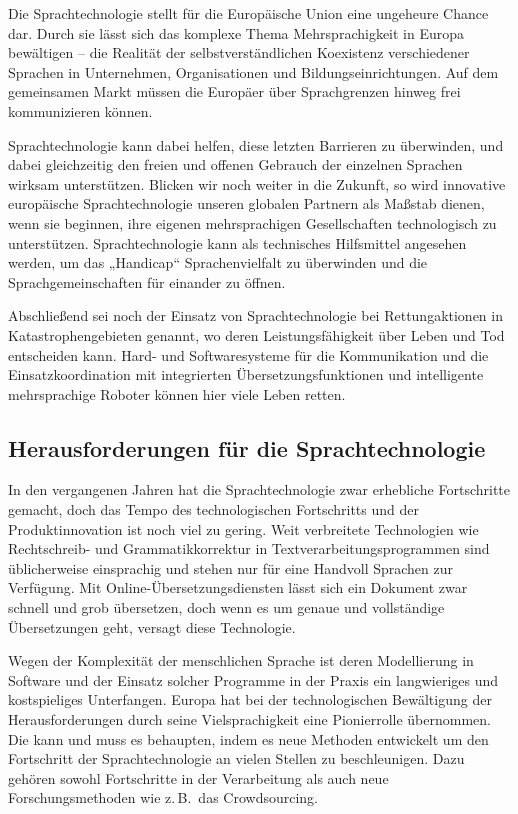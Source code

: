 \begin{multicols}{2}
Die Sprachtechnologie stellt für die Europäische Union eine ungeheure Chance dar. Durch sie lässt sich das komplexe Thema Mehrsprachigkeit in Europa bewältigen -- 
die Realität der selbstverständlichen Koexistenz verschiedener Sprachen in Unternehmen, Organisationen und Bildungseinrichtungen. 
Auf dem gemeinsamen Markt müssen die Europäer über Sprachgrenzen hinweg frei kommunizieren können.  


Sprachtechnologie kann dabei helfen, diese letzten Barrieren zu überwinden, und dabei gleichzeitig den freien und offenen Gebrauch 
der einzelnen Sprachen wirksam 
unterstützen. Blicken wir noch weiter in die Zukunft, so wird innovative europäische Sprachtechnologie unseren globalen Partnern als Maßstab dienen, wenn sie beginnen, ihre eigenen mehrsprachigen Gesellschaften technologisch zu unterstützen. Sprachtechnologie kann als technisches Hilfsmittel angesehen werden, um das „Handicap“ Sprachenvielfalt zu überwinden und die Sprachgemeinschaften für einander zu öffnen.

Abschließend sei noch der Einsatz von Sprachtechnologie bei Rettungaktionen in Katastrophengebieten genannt, wo deren Leistungsfähigkeit über Leben und Tod entscheiden kann. 
Hard- und Softwaresysteme für die Kommunikation und die Einsatzkoordination mit integrierten Übersetzungsfunktionen und  
intelligente mehrsprachige Roboter können hier viele Leben retten.

\subsection{Herausforderungen für die Sprachtechnologie}

In den vergangenen Jahren hat die Sprachtechnologie zwar erhebliche Fortschritte gemacht, doch das Tempo des technologischen Fortschritts und der Produktinnovation ist noch viel zu gering. Weit verbreitete Technologien wie Rechtschreib- und Grammatikkorrektur in Textverarbeitungsprogrammen sind üblicherweise einsprachig und stehen nur für eine Handvoll Sprachen zur Verfügung. Mit On\-line-Über\-set\-zungs\-diensten lässt sich ein Dokument zwar schnell und grob übersetzen, doch wenn es um genaue und vollständige Übersetzungen geht, versagt diese Technologie.


Wegen der Komplexität der menschlichen Sprache ist deren Modellierung in Software und der Einsatz solcher Programme in der Praxis ein langwieriges und kostspieliges Unterfangen. 
Europa hat bei der technologischen Bewältigung der Herausforderungen durch seine Vielsprachigkeit eine Pionierrolle übernommen.  Die kann und muss es behaupten, indem es neue Methoden entwickelt um den Fortschritt der Sprachtechnologie an vielen Stellen zu beschleunigen. 
Dazu gehören sowohl Fortschritte in der Verarbeitung als auch neue Forschungsmethoden wie z.\,B.~das Crowdsourcing. 
 

\end{multicols}
